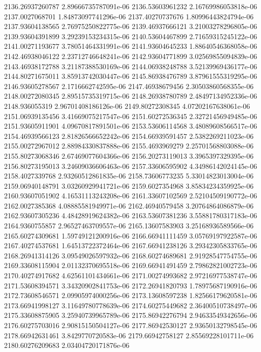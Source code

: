 {2136.26937260787 2.89666735787091e-06
2136.53603961232 2.16769986053818e-06
2137.0027068701 1.84873097741296e-06
2137.40270737676 1.80996443824794e-06
2137.93604138565 2.76975250822775e-06
2139.46937666121 3.21003278296805e-06
2139.93604391899 3.29239153234315e-06
2140.53604467899 2.71659315245122e-06
2141.00271193677 3.78051464331991e-06
2141.93604645233 1.88640546368058e-06
2142.46938046122 2.23712746648241e-06
2142.93604771899 3.02569855094839e-06
2143.46938172788 3.21187388530169e-06
2144.06938248788 3.52139969436177e-06
2144.80271675011 3.85913742030447e-06
2145.86938476789 3.87961555319295e-06
2146.93605278567 2.1716662742595e-06
2147.46938679456 2.30503860568355e-06
2148.00272080345 2.89515735319715e-06
2148.26938780789 2.48497134952336e-06
2148.936055319 2.96701408186126e-06
2149.80272308345 4.07202167638061e-06
2151.06939135456 3.41669075217547e-06
2151.60272536345 2.32721456949485e-06
2151.93605911901 4.09670817891501e-06
2153.53606114568 3.48089608566517e-06
2154.46939566123 2.81826566652242e-06
2154.66939591457 2.5382269211023e-06
2155.00272967012 2.88984330837888e-06
2155.4693969279 2.25701568803088e-06
2155.80273068346 2.67469077604366e-06
2156.20273119013 3.3965397329395e-06
2156.80273195013 3.24609036606463e-06
2157.33606595902 4.34986142024145e-06
2158.4027339768 2.93260512861835e-06
2158.73606773235 5.33014823013004e-06
2159.06940148791 3.03260929941721e-06
2159.6027354968 3.85834234359925e-06
2160.93607051902 4.16531113243208e-06
2161.33607102569 2.52104509190772e-06
2162.0027385368 4.08885581949971e-06
2162.46940579458 3.20764864086879e-06
2162.93607305236 4.48428919624382e-06
2163.53607381236 3.55881780317183e-06
2164.9360755857 2.96527463709557e-06
2165.13607583903 3.25168936589566e-06
2165.60274309681 1.59749121200916e-06
2166.66941111459 3.05769197922587e-06
2167.40274537681 1.64513722372464e-06
2167.66941238126 3.29342305833765e-06
2168.26941314126 3.09549026597932e-06
2168.60274689681 2.91928547754755e-06
2169.33608115904 2.01132370695518e-06
2169.66941491459 2.79862821002723e-06
2170.40274917682 4.62561101434661e-06
2171.00274993682 2.97216977538747e-06
2171.53608394571 3.34320902841753e-06
2172.26941820793 1.78975687190916e-06
2172.73608546571 2.09905974000256e-06
2173.13608597238 1.82566179620581e-06
2173.66941998127 3.11649780778639e-06
2174.60275449682 2.36400510738497e-06
2175.33608875905 3.25940739965789e-06
2175.86942276794 2.94633549342656e-06
2176.60275703016 2.90815150504127e-06
2177.86942530127 2.93650132798545e-06
2178.66942631461 3.8429770720583e-06
2179.66942758127 2.85569228101711e-06
2180.60276209683 2.03404720171876e-06
}
